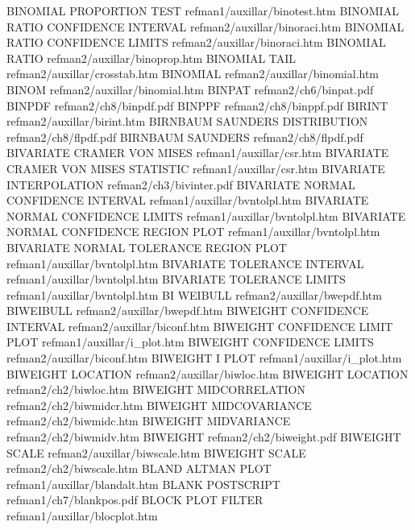 BINOMIAL PROPORTION TEST                refman1/auxillar/binotest.htm
BINOMIAL RATIO CONFIDENCE INTERVAL      refman2/auxillar/binoraci.htm
BINOMIAL RATIO CONFIDENCE LIMITS        refman2/auxillar/binoraci.htm
BINOMIAL RATIO                          refman2/auxillar/binoprop.htm
BINOMIAL TAIL                           refman2/auxillar/crosstab.htm
BINOMIAL                                refman2/auxillar/binomial.htm
BINOM                                   refman2/auxillar/binomial.htm
BINPAT                                  refman2/ch6/binpat.pdf
BINPDF                                  refman2/ch8/binpdf.pdf
BINPPF                                  refman2/ch8/binppf.pdf
BIRINT                                  refman2/auxillar/birint.htm
BIRNBAUM SAUNDERS DISTRIBUTION          refman2/ch8/flpdf.pdf
BIRNBAUM SAUNDERS                       refman2/ch8/flpdf.pdf
BIVARIATE CRAMER VON MISES              refman1/auxillar/csr.htm
BIVARIATE CRAMER VON MISES STATISTIC    refman1/auxillar/csr.htm
BIVARIATE INTERPOLATION                 refman2/ch3/bivinter.pdf
BIVARIATE NORMAL CONFIDENCE INTERVAL    refman1/auxillar/bvntolpl.htm
BIVARIATE NORMAL CONFIDENCE LIMITS      refman1/auxillar/bvntolpl.htm
BIVARIATE NORMAL CONFIDENCE REGION PLOT refman1/auxillar/bvntolpl.htm
BIVARIATE NORMAL TOLERANCE REGION PLOT  refman1/auxillar/bvntolpl.htm
BIVARIATE TOLERANCE INTERVAL            refman1/auxillar/bvntolpl.htm
BIVARIATE TOLERANCE LIMITS              refman1/auxillar/bvntolpl.htm
BI WEIBULL                              refman2/auxillar/bwepdf.htm
BIWEIBULL                               refman2/auxillar/bwepdf.htm
BIWEIGHT CONFIDENCE INTERVAL            refman2/auxillar/biconf.htm
BIWEIGHT CONFIDENCE LIMIT PLOT          refman1/auxillar/i_plot.htm
BIWEIGHT CONFIDENCE LIMITS              refman2/auxillar/biconf.htm
BIWEIGHT I PLOT                         refman1/auxillar/i_plot.htm
BIWEIGHT LOCATION                       refman2/auxillar/biwloc.htm
BIWEIGHT LOCATION                       refman2/ch2/biwloc.htm
BIWEIGHT MIDCORRELATION                 refman2/ch2/biwmidcr.htm
BIWEIGHT MIDCOVARIANCE                  refman2/ch2/biwmidc.htm
BIWEIGHT MIDVARIANCE                    refman2/ch2/biwmidv.htm
BIWEIGHT                                refman2/ch2/biweight.pdf
BIWEIGHT SCALE                          refman2/auxillar/biwscale.htm
BIWEIGHT SCALE                          refman2/ch2/biwscale.htm
BLAND ALTMAN PLOT                       refman1/auxillar/blandalt.htm
BLANK POSTSCRIPT                        refman1/ch7/blankpos.pdf
BLOCK PLOT FILTER                       refman1/auxillar/blocplot.htm
